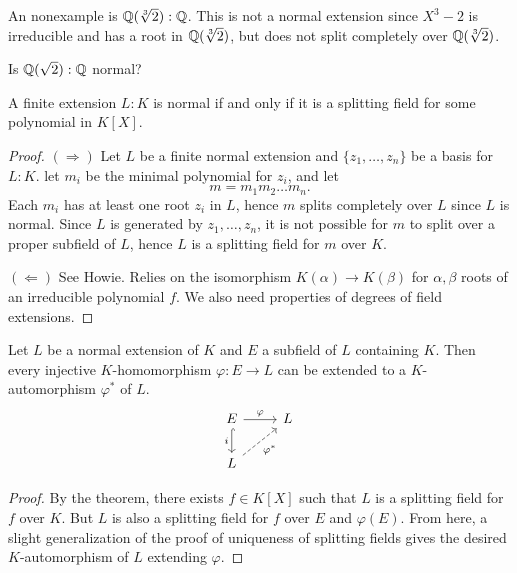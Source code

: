 \begin{example}
  An nonexample is $\mathbb{Q}(\sqrt[3]{2}) : \mathbb{Q}$. This is not
  a normal extension since $X^3 - 2$ is irreducible
  and has a root in $\mathbb{Q}(\sqrt[3]{2})$, but does not
  split completely over $\mathbb{Q}(\sqrt[3]{2})$.
\end{example}

\begin{remark}
  Is $\mathbb{Q}(\sqrt{2}) : \mathbb{Q}$ normal?
\end{remark}

\begin{theorem}
  \label{thm:normal-splitting}
  A finite extension $L : K$ is normal if and only if
  it is a splitting field for some polynomial in $K[X]$.
\end{theorem}

\begin{proof}
  $(\Rightarrow)$ Let $L$ be a finite normal extension
  and $\{z_1, \dots, z_n\}$ be a basis for $L : K$.
  let $m_i$ be the minimal polynomial for $z_i$, and
  let
  \[
    m = m_1 m_2 \dots m_n.
  \]
  Each $m_i$ has at least one root $z_i$ in $L$, hence
  $m$ splits completely over $L$ since $L$ is normal.
  Since $L$ is generated by $z_1, \dots, z_n$, it is
  not possible for $m$ to split over a proper subfield
  of $L$, hence $L$ is a splitting field for $m$ over $K$.

  $(\Leftarrow)$ See Howie. Relies on the isomorphism
  $K(\alpha) \to K(\beta)$ for $\alpha, \beta$ roots
  of an irreducible polynomial $f$. We also need
  properties of degrees of field extensions.
\end{proof}

\begin{corollary}
  \label{thm:extend-automorphism}
  Let $L$ be a normal extension of $K$ and $E$ a
  subfield of $L$ containing $K$. Then every injective
  $K$-homomorphism $\varphi : E \to L$ can be extended to
  a $K$-automorphism $\varphi^*$ of $L$.
\[
  \begin{tikzcd}
    E \dar[hook, swap, "i"] \rar{\varphi} & L \\
    L \urar[dashed, "\varphi^*"'] &
  \end{tikzcd}
\]
\end{corollary}

\begin{proof}
  By the theorem, there exists $f \in K[X]$ such that
  $L$ is a splitting field for $f$ over $K$. But
  $L$ is also a splitting field for $f$ over $E$ and
  $\varphi(E)$. From here, a slight generalization of the
  proof of uniqueness of splitting fields gives
  the desired $K$-automorphism of $L$ extending $\varphi$.
\end{proof}

